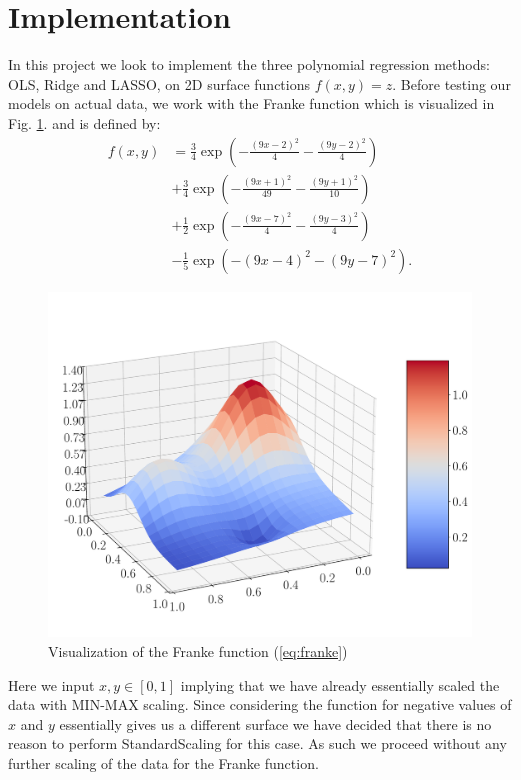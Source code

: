 \documentclass[%
reprint,
amsmath,amssymb,
aps,
pra,
]{revtex4-2}
\begin{document}
\section{Implementation}
In this project we look to implement the three polynomial regression methods: OLS, Ridge and  LASSO, on 2D surface functions \(f(x,y)=z\). Before testing our models on actual data, we work with the Franke function which is visualized in Fig. \ref{fig:frankefunction}. and is defined by:
\begin{align}	\label{eq:franke}
	f(x,y)&=\frac{3}{4}\exp(-\frac{(9x-2)^2}{4}-\frac{(9y-2)^2}{4})\nonumber\\
	&+\frac{3}{4}\exp(-\frac{(9x+1)^2}{49}-\frac{(9y+1)^2}{10})\nonumber\\
	&+\frac{1}{2}\exp(-\frac{(9x-7)^2}{4}-\frac{(9y-3)^2}{4})\nonumber\\
	&-\frac{1}{5}\exp(-(9x-4)^2-(9y-7)^2).
\end{align}
\begin{figure}[H]
	\includegraphics[width=\linewidth]{Python/Figures/FrankeFunction.pdf}
	\caption{Visualization of the Franke function (\ref{eq:franke})}
	\label{fig:frankefunction}
\end{figure}
Here we input $x,y\in[0,1]$ implying that we have already essentially scaled the data with MIN-MAX scaling. Since considering the function for negative values of $x$ and $y$ essentially gives us a different surface we have decided that there is no reason to perform StandardScaling for this case. As such we proceed without any further scaling of the data for the Franke function. 
\end{document}
